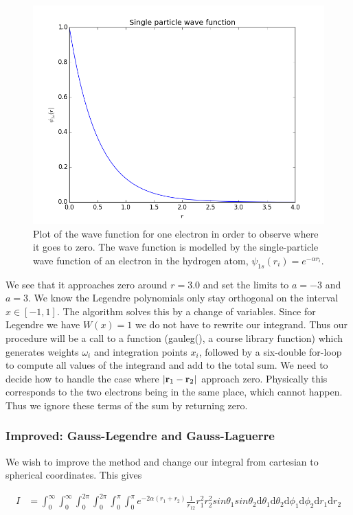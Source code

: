 \documentclass[norsk,a4paper,11pt]{article}
\begin{document}
\begin{figure}
    \includegraphics[width=0.9\linewidth]{m1.png}
    \caption{
        \label{fig:m1}
    Plot of the wave function for one electron in order to observe where it goes to zero. The wave function is 
    modelled by the single-particle wave function of an electron in the hydrogen atom, $\psi_{1s}(r_i) = e^{-\alpha r_i}$.}
\end{figure}

We see that it approaches zero around $r=3.0$ and set the limits to $a=-3$ and $a=3$. We know the Legendre polynomials only stay
orthogonal on the interval $x\in [-1, 1]$. The algorithm solves this by a change of variables.
Since for Legendre we have $W(x) = 1$ we do not have to rewrite our integrand. Thus our procedure will be a call to a function
(gauleg(), a course library function) which generates weights $\omega_i$ and integration points $x_i$, followed by
a six-double for-loop to compute all values of the integrand and add to the total sum.
We need to decide how to handle the case where $|{\bf r}_1 - {\bf r}_2|$ approach zero.
Physically this corresponds to the two electrons being in the same place, which cannot happen. Thus we ignore these terms of the sum
by returning zero.

\subsubsection{Improved: Gauss-Legendre and Gauss-Laguerre}
We wish to improve the method and change our integral from cartesian to spherical coordinates. This gives

\begin{align*}
    I & =\int_{0}^{\infty} \int_{0}^{\infty} \int_{0}^{2\pi} \int_{0}^{2\pi} \int_{0}^{\pi} \int_{0}^{\pi}
      e^{-2\alpha (r_1+r_2)}\frac{1}{r_{12}} r_1^2 r_2^2 sin\theta_1 sin\theta_2
     \mathrm{d}\theta_1 \mathrm{d}\theta_2 \mathrm{d}\phi_1 \mathrm{d}\phi_2 \mathrm{d}r_1 \mathrm{d}r_2  
\end{align*}
\end{document}
